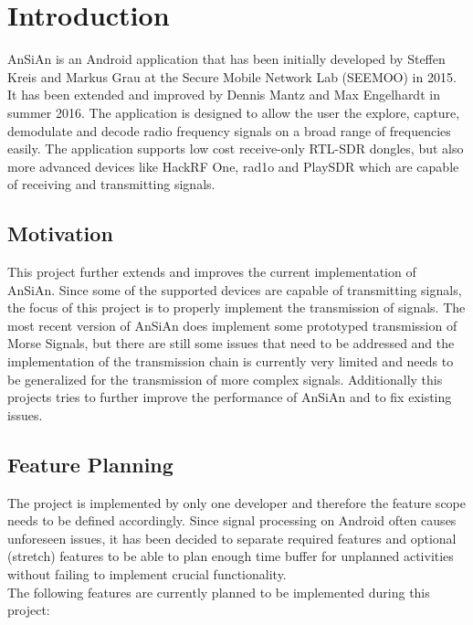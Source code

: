 \chapter{Introduction}
	\gls{AnSiAn} is an Android application that has been initially developed by Steffen Kreis and Markus Grau at the Secure Mobile Network Lab (SEEMOO) in 2015. It has been extended and improved by Dennis Mantz and Max Engelhardt in summer 2016. The application is designed to allow the user the explore, capture, demodulate and decode radio frequency signals on a broad range of frequencies easily. The application supports low cost receive-only RTL-SDR dongles, but also more advanced devices like HackRF One, rad1o and PlaySDR which are capable of receiving and transmitting signals.
	
	
\section{Motivation}
	This project further extends and improves the current implementation of \ac{AnSiAn}. Since some of the supported devices are capable of transmitting signals, the focus of this project is to properly implement the transmission of signals. The most recent version of \ac{AnSiAn} does implement some prototyped transmission of Morse Signals, but there are still some issues that need to be addressed and the implementation of the transmission chain is currently very limited and needs to be generalized for the transmission of more complex signals. Additionally this projects tries to further improve the performance of \ac{AnSiAn} and to fix existing issues. 

\section{Feature Planning}
	The project is implemented by only one developer and therefore the feature scope needs to be defined accordingly. Since signal processing on Android often causes unforeseen issues, it has been decided to separate required features and optional (stretch) features to be able to plan enough time buffer for unplanned activities without failing to implement crucial functionality. \\
	
	The following features are currently planned to be implemented during this project:
	
